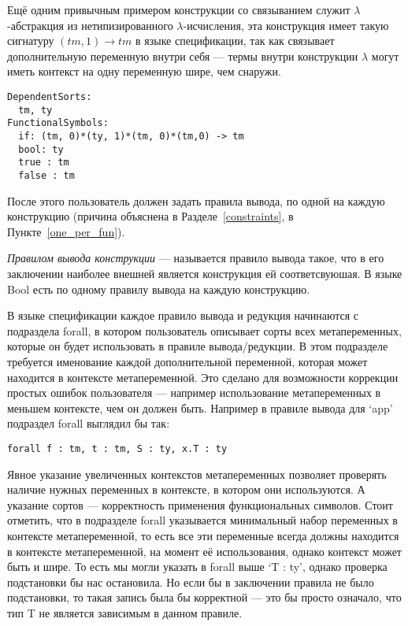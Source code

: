 Ещё одним привычным примером конструкции со связыванием служит $\lambda$-абстракция из нетипизированного $\lambda$-исчисления, эта конструкция имеет такую сигнатуру $(tm, 1) \rightarrow tm$ в языке спецификации, так как связывает дополнительную переменную внутри себя --- термы внутри конструкции $\lambda$ могут иметь контекст на одну переменную шире, чем снаружи.

\begin{lstlisting}[label={lst_bool_funs}, caption={Конструкции и сорты языка Bool, описанные в языке спецификации},captionpos=b, frame=single, float]
DependentSorts:
  tm, ty
FunctionalSymbols:
  if: (tm, 0)*(ty, 1)*(tm, 0)*(tm,0) -> tm
  bool: ty
  true : tm
  false : tm
\end{lstlisting}

После этого пользователь должен задать правила вывода, по одной на каждую конструкцию (причина объяснена в Разделе~\ref{constraints}, в Пункте~\ref{one_per_fun}).

\textit{Правилом вывода конструкции} --- называется правило вывода такое, что в его заключении наиболее внешней является конструкция ей соответсвуюшая. В языке Bool есть по одному правилу вывода на каждую конструкцию.

В языке спецификации каждое правило вывода и редукция начинаются с подраздела forall, в котором пользователь описывает сорты всех метапеременных, которые он будет использовать в правиле вывода/редукции. В этом подразделе требуется именование каждой дополнительной переменной, которая может находится в контексте метапеременной. Это сделано для возможности коррекции простых ошибок пользователя --- например использование метапеременных в меньшем контексте, чем он должен быть. Например в правиле вывода для `app' подраздел forall выглядил бы так:
\begin{lstlisting}
forall f : tm, t : tm, S : ty, x.T : ty
\end{lstlisting}

Явное указание увеличенных контекстов метапеременных позволяет проверять наличие нужных переменных в контексте, в котором они используются. А указание сортов --- корректность применения функциональных символов. Стоит отметить, что в подразделе forall указывается минимальный набор переменных в контексте метапеременной, то есть все эти переменные всегда должны находится в контексте метапеременной, на момент её использования, однако контекст может быть и шире. То есть мы могли указать в forall выше `T : ty', однако проверка подстановки бы нас остановила. Но если бы в заключении правила не было подстановки, то такая запись была бы корректной --- это бы просто означало, что тип T не является зависимым в данном правиле.

